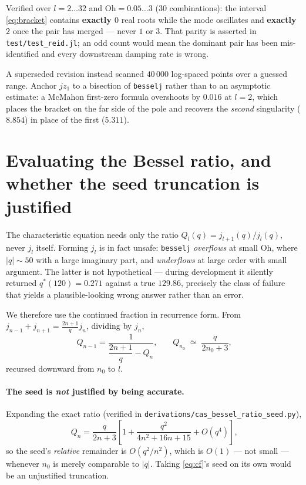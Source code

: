 \documentclass[11pt]{article}
\newcommand{\Oh}{\mathrm{Oh}}
\begin{document}
Verified over $l=2\ldots32$ and $\Oh=0.05\ldots3$ (30 combinations): the interval
\eqref{eq:bracket} contains \textbf{exactly $0$} real roots while the mode oscillates and
\textbf{exactly $2$} once the pair has merged --- never $1$ or $3$. That parity is asserted in
\texttt{test/test\_reid.jl}; an odd count would mean the dominant pair has been
mis-identified and every downstream damping rate is wrong.

A superseded revision instead scanned $40\,000$ log-spaced points over a guessed range. Anchor
$jz_1$ to a bisection of \texttt{besselj} rather than to an asymptotic estimate: a McMahon
first-zero formula overshoots by $0.016$ at $l=2$, which places the bracket on the far side of
the pole and recovers the \emph{second} singularity ($8.854$) in place of the first ($5.311$).

\section{Evaluating the Bessel ratio, and whether the seed truncation is justified}

The characteristic equation needs only the ratio $Q_l(q)=j_{l+1}(q)/j_l(q)$, never $j_l$
itself. Forming $j_l$ is in fact unsafe: \texttt{besselj} \emph{overflows} at small $\Oh$,
where $|q|\sim50$ with a large imaginary part, and \emph{underflows} at large order with small
argument. The latter is not hypothetical --- during development it silently returned
$q^\ast(120)=0.271$ against a true $129.86$, precisely the class of failure that yields a
plausible-looking wrong answer rather than an error.

We therefore use the continued fraction in recurrence form. From
$j_{n-1}+j_{n+1}=\tfrac{2n+1}{q}j_n$, dividing by $j_n$,
\begin{equation}
  Q_{n-1} = \frac{1}{\dfrac{2n+1}{q} - Q_n}\text{,}\qquad
  Q_{n_0}\;\simeq\;\frac{q}{2n_0+3}\text{,}
  \label{eq:cf}
\end{equation}
recursed downward from $n_0$ to $l$.

\paragraph{The seed is \emph{not} justified by being accurate.} Expanding the exact ratio
(verified in \texttt{derivations/cas\_bessel\_ratio\_seed.py}),
\begin{equation}
  Q_n = \frac{q}{2n+3}\left[1 + \frac{q^2}{4n^2+16n+15} + O(q^4)\right]\text{,}
  \label{eq:seed-remainder}
\end{equation}
so the seed's \emph{relative} remainder is $O(q^2/n^2)$, which is $O(1)$ --- not small ---
whenever $n_0$ is merely comparable to $|q|$. Taking \eqref{eq:cf}'s seed on its own would be
an unjustified truncation.
\end{document}
